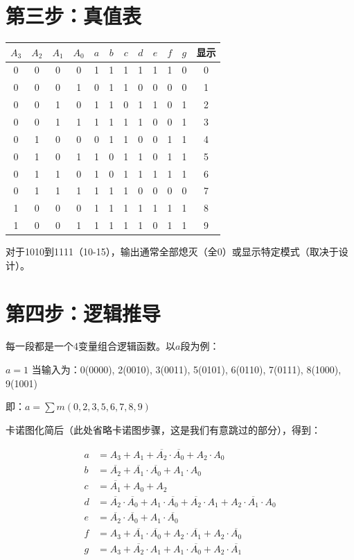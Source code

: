 \section{第三步：真值表}

\begin{center}
\small
\begin{tabular}{|c|c|c|c||c|c|c|c|c|c|c||c|}
\hline
$A_3$ & $A_2$ & $A_1$ & $A_0$ & $a$ & $b$ & $c$ & $d$ & $e$ & $f$ & $g$ & 显示 \\
\hline
0 & 0 & 0 & 0 & 1 & 1 & 1 & 1 & 1 & 1 & 0 & 0 \\
0 & 0 & 0 & 1 & 0 & 1 & 1 & 0 & 0 & 0 & 0 & 1 \\
0 & 0 & 1 & 0 & 1 & 1 & 0 & 1 & 1 & 0 & 1 & 2 \\
0 & 0 & 1 & 1 & 1 & 1 & 1 & 1 & 0 & 0 & 1 & 3 \\
0 & 1 & 0 & 0 & 0 & 1 & 1 & 0 & 0 & 1 & 1 & 4 \\
0 & 1 & 0 & 1 & 1 & 0 & 1 & 1 & 0 & 1 & 1 & 5 \\
0 & 1 & 1 & 0 & 1 & 0 & 1 & 1 & 1 & 1 & 1 & 6 \\
0 & 1 & 1 & 1 & 1 & 1 & 1 & 0 & 0 & 0 & 0 & 7 \\
1 & 0 & 0 & 0 & 1 & 1 & 1 & 1 & 1 & 1 & 1 & 8 \\
1 & 0 & 0 & 1 & 1 & 1 & 1 & 1 & 0 & 1 & 1 & 9 \\
\hline
\end{tabular}
\end{center}

对于1010到1111（10-15），输出通常全部熄灭（全0）或显示特定模式（取决于设计）。

\section{第四步：逻辑推导}

每一段都是一个4变量组合逻辑函数。以$a$段为例：

$a = 1$ 当输入为：0(0000), 2(0010), 3(0011), 5(0101), 6(0110), 7(0111), 8(1000), 9(1001)

即：$a = \sum m(0,2,3,5,6,7,8,9)$

卡诺图化简后（此处省略卡诺图步骤，这是我们有意跳过的部分），得到：

\begin{align}
  a &= A_3 + A_1 + \overline{A_2}\cdot\overline{A_0} + A_2\cdot A_0 \\
  b &= \overline{A_2} + \overline{A_1}\cdot\overline{A_0} + A_1\cdot A_0 \\
  c &= \overline{A_1} + A_0 + A_2 \\
  d &= \overline{A_2}\cdot\overline{A_0} + A_1\cdot\overline{A_0} + \overline{A_2}\cdot A_1 + A_2\cdot\overline{A_1}\cdot A_0 \\
  e &= \overline{A_2}\cdot\overline{A_0} + A_1\cdot\overline{A_0} \\
  f &= A_3 + \overline{A_1}\cdot\overline{A_0} + A_2\cdot\overline{A_1} + A_2\cdot\overline{A_0} \\
  g &= A_3 + \overline{A_2}\cdot A_1 + A_1\cdot\overline{A_0} + A_2\cdot\overline{A_1}
\end{align}

